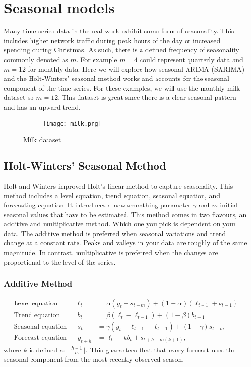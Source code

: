 \documentclass{article}
\begin{document}
  \section{Seasonal models}
  Many time series data in the real work exhibit some form of seasonality. This includes higher network traffic during peak hours of the day or increased spending during Christmas. As such, there is a defined frequency of seasonality commonly denoted as $m$. For example $m=4$ could represent quarterly data and $m=12$ for monthly data. Here we will explore how seasonal ARIMA (SARIMA) and the Holt-Winters' seasonal method works and accounts for the seasonal component of the time series. For these examples, we will use the monthly milk dataset so $m=12$. This dataset is great since there is a clear seasonal pattern and has an upward trend.
  \begin{figure}[H]
    \centering
    \captionsetup{justification=centering}
    \begin{subfigure}[b]{\linewidth}
      \texttt{[image: milk.png]}
    \end{subfigure}
    \caption{Milk dataset}
  \end{figure}

  \newpage
  \subsection{Holt-Winters' Seasonal Method}
  Holt and Winters improved Holt's linear method to capture seasonality. This method includes a level equation, trend equation, seasonal equation, and forecasting equation. It introduces a new smoothing parameter $\gamma$ and $m$ initial seasonal values that have to be estimated. This method comes in two flavours, an additive and multiplicative method. Which one you pick is dependent on your data. The additive method is preferred when seasonal variations and trend change at a constant rate. Peaks and valleys in your data are roughly of the same magnitude. In contrast, multiplicative is preferred when the changes are proportional to the level of the series. 

  \subsubsection{Additive Method}
  \begin{align*}
    \text{Level equation}   &&\ell_{t} &= \alpha(y_{t} - s_{t-m}) + (1 - \alpha)(\ell_{t-1} + b_{t-1})\\
    \text{Trend equation}   &&b_{t} &= \beta(\ell_{t} - \ell_{t-1}) + (1 - \beta)b_{t-1}\\
    \text{Seasonal equation}   &&s_{t} &= \gamma (y_{t}-\ell_{t-1}-b_{t-1}) + (1-\gamma)s_{t-m}\\
    \text{Forecast equation}   && \hat{y}_{t+h} &= \ell_{t} + hb_{t} + s_{t+h-m(k+1)},
  \end{align*}
  where $k$ is defined as $\lfloor\frac{h-1}{m}\rfloor$. This guarantees that that every forecast uses the seasonal component from the most recently observed season. 
\end{document}
